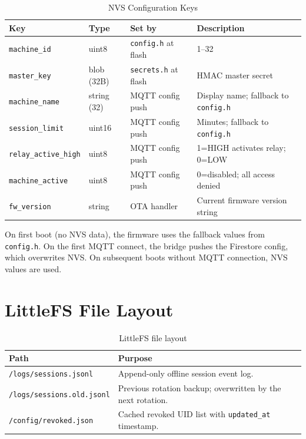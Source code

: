 \begin{table}[H]
\centering
\caption{NVS Configuration Keys}
\begin{tabular}{L{3.5cm}C{2.5cm}L{3cm}L{5cm}}
\toprule
\textbf{Key} & \textbf{Type} & \textbf{Set by} & \textbf{Description} \\
\midrule
\texttt{machine\_id}   & uint8   & \texttt{config.h} at flash & 1--32 \\
\texttt{master\_key}   & blob (32B) & \texttt{secrets.h} at flash & HMAC master secret \\
\texttt{machine\_name} & string (32) & MQTT config push & Display name; fallback to \texttt{config.h} \\
\texttt{session\_limit} & uint16 & MQTT config push & Minutes; fallback to \texttt{config.h} \\
\texttt{relay\_active\_high} & uint8 & MQTT config push & 1=HIGH activates relay; 0=LOW \\
\texttt{machine\_active} & uint8 & MQTT config push & 0=disabled; all access denied \\
\texttt{fw\_version}  & string & OTA handler & Current firmware version string \\
\bottomrule
\end{tabular}
\end{table}

On first boot (no NVS data), the firmware uses the fallback values from \texttt{config.h}. On the first MQTT connect, the bridge pushes the Firestore config, which overwrites NVS. On subsequent boots without MQTT connection, NVS values are used.

\section{LittleFS File Layout}

\begin{table}[H]
\centering
\caption{LittleFS file layout}
\begin{tabular}{L{5cm}L{9cm}}
\toprule
\textbf{Path} & \textbf{Purpose} \\
\midrule
\texttt{/logs/sessions.jsonl} & Append-only offline session event log. \\
\texttt{/logs/sessions.old.jsonl} & Previous rotation backup; overwritten by the next rotation. \\
\texttt{/config/revoked.json} & Cached revoked UID list with \texttt{updated\_at} timestamp. \\
\bottomrule
\end{tabular}
\end{table}

